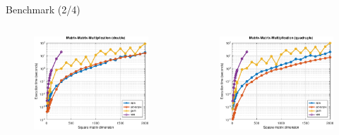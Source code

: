 \begin{frame}{Benchmark (2/4)}

\begin{columns}
\begin{column}{0.3\textwidth}
\begin{figure}
\centering
\includegraphics[width=1.0\linewidth]{res/data/2021-11-24_run-01-mmm-double-semilogy}
\end{figure}
\end{column}
\begin{column}{0.3\textwidth}
\begin{figure}
\centering
\includegraphics[width=1.0\linewidth]{res/data/2021-11-24_run-01-mmm-quadruple-semilogy}

\end{figure}
\end{column}
\end{columns}
\end{frame}
